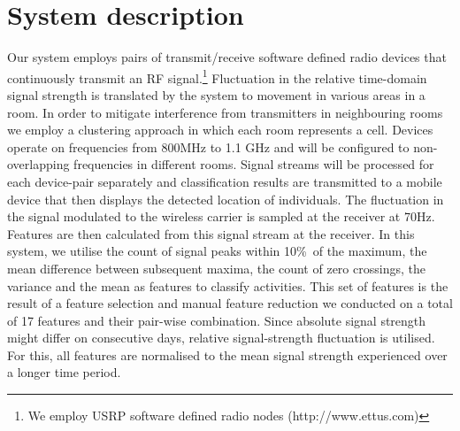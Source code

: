 \documentclass{sig-alternate-ipsn13}
\begin{document}
\section{System description}
Our system employs pairs of transmit/receive software defined radio devices that continuously transmit an RF signal.\footnote{We employ USRP software defined radio nodes (http://www.ettus.com)}
Fluctuation in the relative time-domain signal strength is translated by the system to movement in various areas in a room.
In order to mitigate interference from transmitters in neighbouring rooms we employ a clustering approach in which each room represents a cell.
Devices operate on frequencies from 800MHz to 1.1 GHz and will be configured to non-overlapping frequencies in different rooms.
Signal streams will be processed for each device-pair separately and classification results are transmitted to a mobile device that then displays the detected location of individuals.
The fluctuation in the signal modulated to the wireless carrier is sampled at the receiver at 70Hz. 
Features are then calculated from this signal stream at the receiver.
In this system, we utilise the count of signal peaks within 10\%\ of the maximum, the mean difference between subsequent maxima, the count of zero crossings, %
the variance and the mean as features to classify activities.
This set of features is the result of a feature selection and manual feature reduction we conducted on a total of 17 features and their pair-wise combination. 
Since absolute signal strength might differ on consecutive days, relative signal-strength fluctuation is utilised. 
For this, all features are normalised to the mean signal strength experienced over a longer time period.




%

%
%


\end{document}
